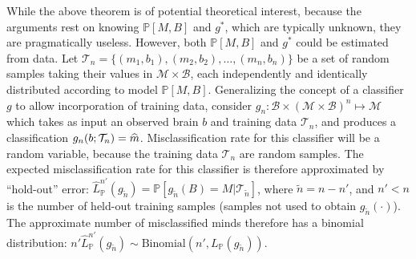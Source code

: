 \documentclass{article}
\newcommand{\mB}{\mathcal{B}}
\newcommand{\mM}{\mathcal{M}}
\newcommand{\PP}{\mathbb{P}}           %
\newcommand{\EE}{\mathbb{E}}           %
\providecommand{\mc}[1]{\mathcal{#1}}
\providecommand{\mh}[1]{\widehat{#1}}
\providecommand{\mt}[1]{\widetilde{#1}}
\newcommand{\hL}{\widehat{L}}
\providecommand{\tr}[1]{\textcolor{black}{#1}}
\begin{document}
While the above theorem is of potential theoretical interest, because the arguments rest on knowing $\PP[M,B]$ and $g^*$, which are typically unknown, they are pragmatically useless.  However, both $\PP[M,B]$ and $g^*$ could be estimated from data.  Let $\mc{T}_n=\{(m_1,b_1), (m_2,b_2), \ldots, (m_n,b_n)\}$ be a set of random samples taking their values in $\mc{M} \times \mc{B}$, each independently and identically distributed according to model $\PP[M,B]$.  Generalizing the concept of a classifier $g$ to allow incorporation of training data, consider $g_n:\mB \times (\mc{M} \times \mc{B})^n \mapsto \mM$ which takes as input an observed brain  $b$ and training data $\mc{T}_n$, and produces a classification $g_n(b;\tr{\mc{T}_n})=\mh{m}$.  Misclassification rate for this classifier will be a random variable, because the training data $\mc{T}_n$ are random samples.  The expected misclassification rate for this classifier is therefore approximated by ``hold-out'' error:
$\hL^{n'}_{\PP}(g_{\mt{n}}) = \PP[g_{\mt{n}}(B)=M | \mc{T}_{\mt{n}}]$,
where $\mt{n}=n-n'$, and $n'<n$ is the number of held-out training samples (samples not used to obtain $g_{\mt{n}}(\cdot)$).
The approximate  number of misclassified minds
therefore
has a binomial distribution:  $n' \hL^{n'}_{\PP}(g_{\mt{n}}) \sim \text{Binomial}(n',L_{\PP}(g_{\mt{n}}))$. %
\end{document}
